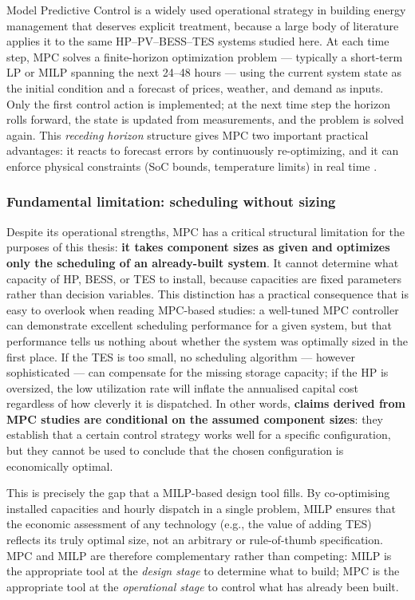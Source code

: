 \documentclass[11pt,a4paper]{report}
\begin{document}
Model Predictive Control is a widely used operational strategy in building energy management that deserves explicit treatment, because a large body of literature applies it to the same HP--PV--BESS--TES systems studied here.
At each time step, MPC solves a finite-horizon optimization problem --- typically a short-term LP or MILP spanning the next 24--48 hours --- using the current system state as the initial condition and a forecast of prices, weather, and demand as inputs.
Only the first control action is implemented; at the next time step the horizon rolls forward, the state is updated from measurements, and the problem is solved again.
This \textit{receding horizon} structure gives MPC two important practical advantages: it reacts to forecast errors by continuously re-optimizing, and it can enforce physical constraints (SoC bounds, temperature limits) in real time \cite{maier2022mpc}.

\subsubsection*{Fundamental limitation: scheduling without sizing}

Despite its operational strengths, MPC has a critical structural limitation for the purposes of this thesis: \textbf{it takes component sizes as given and optimizes only the scheduling of an already-built system}.
It cannot determine what capacity of HP, BESS, or TES to install, because capacities are fixed parameters rather than decision variables.
This distinction has a practical consequence that is easy to overlook when reading MPC-based studies: a well-tuned MPC controller can demonstrate excellent scheduling performance for a given system, but that performance tells us nothing about whether the system was optimally sized in the first place.
If the TES is too small, no scheduling algorithm --- however sophisticated --- can compensate for the missing storage capacity; if the HP is oversized, the low utilization rate will inflate the annualised capital cost regardless of how cleverly it is dispatched.
In other words, \textbf{claims derived from MPC studies are conditional on the assumed component sizes}: they establish that a certain control strategy works well for a specific configuration, but they cannot be used to conclude that the chosen configuration is economically optimal.

This is precisely the gap that a MILP-based design tool fills.
By co-optimising installed capacities and hourly dispatch in a single problem, MILP ensures that the economic assessment of any technology (e.g., the value of adding TES) reflects its truly optimal size, not an arbitrary or rule-of-thumb specification.
MPC and MILP are therefore complementary rather than competing: MILP is the appropriate tool at the \emph{design stage} to determine what to build; MPC is the appropriate tool at the \emph{operational stage} to control what has already been built.
\end{document}
